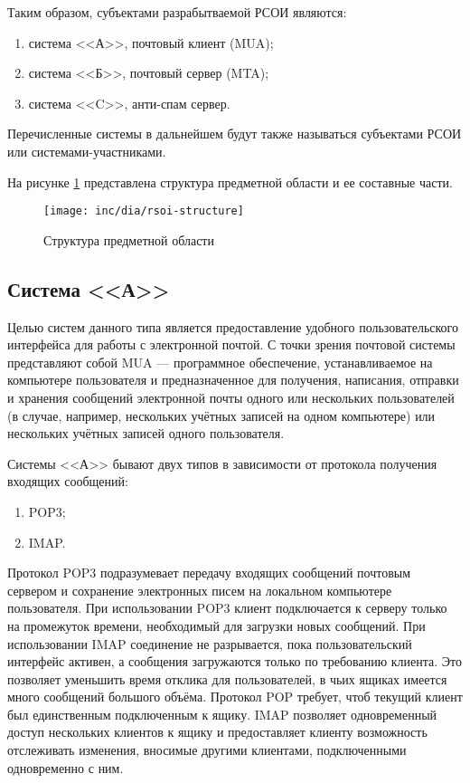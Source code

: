 Таким образом, субъектами разрабытваемой РСОИ являются:

\begin{enumerate}
\item{система <<А>>}, почтовый клиент (MUA);
\item{система <<Б>>}, почтовый сервер (MTA);
\item{система <<C>>}, анти-спам сервер. 
\end{enumerate}

Перечисленные системы в дальнейшем будут также называться субъектами РСОИ или системами-участниками.

На рисунке \ref{fig:structure} представлена структура предметной области и ее составные части.

\begin{figure}
  \centering
  \texttt{[image: inc/dia/rsoi-structure]}
  \caption{Структура предметной области}
  \label{fig:structure}
\end{figure}


\subsection{Система <<А>>}
Целью систем данного типа является предоставление удобного пользовательского интерфейса для работы с электронной почтой. С точки зрения почтовой системы представляют собой MUA --- программное обеспечение, устанавливаемое на компьютере пользователя и предназначенное для получения, написания, отправки и хранения сообщений электронной почты одного или нескольких пользователей (в случае, например, нескольких учётных записей на одном компьютере) или нескольких учётных записей одного пользователя. 

Системы <<А>> бывают двух типов в зависимости от протокола получения входящих сообщений:
\begin{enumerate}
\item{POP3;}
\item{IMAP.}
\end{enumerate}

Протокол POP3 подразумевает передачу входящих сообщений почтовым сервером и сохранение электронных писем на локальном компьютере пользователя. При использовании POP3 клиент подключается к серверу только на промежуток времени, необходимый для загрузки новых сообщений. При использовании IMAP соединение не разрывается, пока пользовательский интерфейс активен, а сообщения загружаются только по требованию клиента. Это позволяет уменьшить время отклика для пользователей, в чьих ящиках имеется много сообщений большого объёма.
Протокол POP требует, чтоб текущий клиент был единственным подключенным к ящику. IMAP позволяет одновременный доступ нескольких клиентов к ящику и предоставляет клиенту возможность отслеживать изменения, вносимые другими клиентами, подключенными одновременно с ним.


